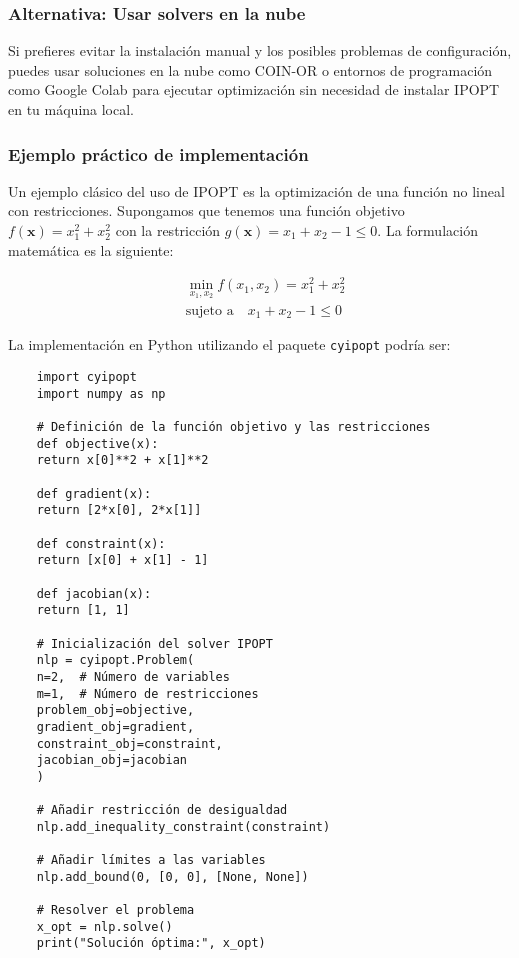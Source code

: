 \subsubsection{Alternativa: Usar solvers en la nube}

\begin{flushleft}
	Si prefieres evitar la instalación manual y los posibles problemas de configuración, puedes usar soluciones en la nube como COIN-OR o entornos de programación como Google Colab para ejecutar optimización sin necesidad de instalar IPOPT en tu máquina local.
\end{flushleft}

\subsubsection{Ejemplo práctico de implementación}

\begin{flushleft}
	Un ejemplo clásico del uso de IPOPT es la optimización de una función no lineal con restricciones. Supongamos que tenemos una función objetivo $f(\mathbf{x})=x_{1}^{2}+x_{2}^{2}$ con la restricción $g(\mathbf{x})=x_{1}+x_{2}-1 \leq 0$. La formulación matemática es la siguiente:
\end{flushleft}

$$
\begin{aligned}
	& \min_{x_{1}, x_{2}} f\left(x_{1}, x_{2}\right)=x_{1}^{2}+x_{2}^{2} \\
	& \text{sujeto a} \quad x_{1}+x_{2}-1 \leq 0
\end{aligned}
$$

\begin{flushleft}
	La implementación en Python utilizando el paquete \texttt{cyipopt} podría ser:
\end{flushleft}

\begin{verbatim}
	import cyipopt
	import numpy as np
	
	# Definición de la función objetivo y las restricciones
	def objective(x):
	return x[0]**2 + x[1]**2
	
	def gradient(x):
	return [2*x[0], 2*x[1]]
	
	def constraint(x):
	return [x[0] + x[1] - 1]
	
	def jacobian(x):
	return [1, 1]
	
	# Inicialización del solver IPOPT
	nlp = cyipopt.Problem(
	n=2,  # Número de variables
	m=1,  # Número de restricciones
	problem_obj=objective,
	gradient_obj=gradient,
	constraint_obj=constraint,
	jacobian_obj=jacobian
	)
	
	# Añadir restricción de desigualdad
	nlp.add_inequality_constraint(constraint)
	
	# Añadir límites a las variables
	nlp.add_bound(0, [0, 0], [None, None])
	
	# Resolver el problema
	x_opt = nlp.solve()
	print("Solución óptima:", x_opt)
\end{verbatim}

